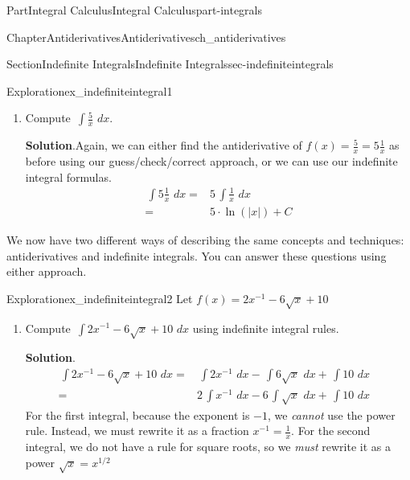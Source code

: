 \documentclass[oneside,10pt,]{tufte-book}
\newcommand{\blocktitlefont}{\relax}
\numberwithin{equation}{chapter}
\newcommand{\intdx}[1]{{\,\int#1\,\,dx}}
\newcommand{\amp}{&}
\begin{document}
\begin{partptx}{Part}{Integral Calculus}{}{Integral Calculus}{}{}{part-integrals}
\begin{chapterptx}{Chapter}{Antiderivatives}{}{Antiderivatives}{}{}{ch_antiderivatives}
\begin{sectionptx}{Section}{Indefinite Integrals}{}{Indefinite Integrals}{}{}{sec-indefiniteintegrals}
\begin{exploration}{Exploration}{}{ex_indefiniteintegral1}
\begin{enumerate}[font=\bfseries,label=(\alph*),ref=\alph*]
\begin{align*}
\intdx{\frac{1}{\sqrt[3]{x}}} = \amp \intdx{ x^{-1/3}} 
\end{align*}
Because \(\frac{-1}{3}\neq -1\), we can use the indefinite integral formula \(\intdx{x^m} = \frac{1}{m+1}x^{m+1} + C\)%
\begin{align*}
\phantom{\intdx{ \frac{1}{ \sqrt[3]{x} }  }} = \amp \dfrac{1}{-1/3+1} x^{-1/3+1} \\
= \amp \dfrac{1}{2/3} x^{2/3} + C \\
= \amp \dfrac{1}{0.66\dots} x^{0.66\dots}
\end{align*}
%
\item{}Compute \(\intdx{\frac{5}{x}} \).%
\par\smallskip%
\noindent\textbf{\blocktitlefont Solution}.\hypertarget{ex_indefiniteintegral1-3-2}{}\quad{}Again, we can either find the antiderivative of \(f(x) = \frac{5}{x} = 5\frac{1}{x}\) as before using our guess\slash{}check\slash{}correct approach, or we can use our indefinite integral formulas.%
\begin{align*}
\intdx{5\frac{1}{x} } = \amp 5\intdx{\frac{1}{x}}\\
= \amp 5\cdot \ln(|x|) + C
\end{align*}
%
\end{enumerate}%
\end{exploration}%
We now have two different ways of describing the same concepts and techniques: antiderivatives and indefinite integrals. You can answer these questions using either approach.%
\begin{exploration}{Exploration}{}{ex_indefiniteintegral2}%
Let  \(f(x) = 2x^{-1} - 6\sqrt{x} + 10\)%
\begin{enumerate}[font=\bfseries,label=(\alph*),ref=\alph*]%
\item{}Compute \(\intdx{ 2x^{-1} - 6\sqrt{x} + 10 }\) using indefinite integral rules.%
\par\smallskip%
\noindent\textbf{\blocktitlefont Solution}.\hypertarget{ex_indefiniteintegral2-2-2}{}\quad{}%
\begin{align*}
\intdx{ 2x^{-1} - 6\sqrt{x} + 10 } = \amp \intdx{ 2x^{-1} } - \intdx{6\sqrt{x}} + \intdx{10} \amp \\
= \amp 2\intdx{x^{-1}} - 6\intdx{\sqrt{x}} + \intdx{10}  
\end{align*}
For the first integral, because the exponent is \(-1\), we \emph{cannot} use the power rule.  Instead, we must rewrite it as a fraction \(x^{-1}=\frac{1}{x}\). For the second integral, we do not have a rule for square roots, so we \emph{must} rewrite it as a power \(\sqrt{x} = x^{1/2}\)%

\end{enumerate}
\end{exploration}
\end{sectionptx}
\end{chapterptx}
\end{partptx}
\end{document}
